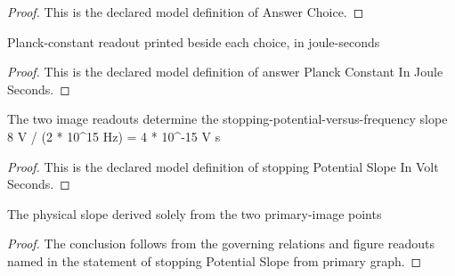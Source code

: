 \begin{proof}
  This is the declared model definition of Answer Choice.
\end{proof}
\begin{definition}
  \label{def:physics:phyx-mini-0499:phyxminiproblems-problemphyxmini0499-answerplanckconstantinjouleseconds}
  Planck-constant readout printed beside each choice, in joule-seconds
\end{definition}
\begin{proof}
  This is the declared model definition of answer Planck Constant In Joule Seconds.
\end{proof}
\begin{definition}
  \label{def:physics:phyx-mini-0499:phyxminiproblems-problemphyxmini0499-stoppingpotentialslopeinvoltseconds}
  The two image readouts determine the stopping-potential-versus-frequency slope 8 V / (2 * 10\textasciicircum{}15 Hz) = 4 * 10\textasciicircum{}-15 V s
\end{definition}
\begin{proof}
  This is the declared model definition of stopping Potential Slope In Volt Seconds.
\end{proof}
\begin{lemma}
  \label{lem:physics:phyx-mini-0499:phyxminiproblems-problemphyxmini0499-stoppingpotentialslope-from-primary-graph}
  The physical slope derived solely from the two primary-image points
\end{lemma}
\begin{proof}
  The conclusion follows from the governing relations and figure readouts named in the statement of stopping Potential Slope from primary graph.
\end{proof}

